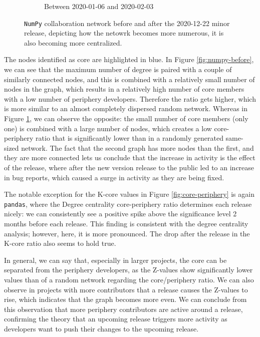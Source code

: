 \begin{figure}[!htbp]
\begin{subfigure}{0.49\textwidth}
        \caption{Between 2020-01-06 and 2020-02-03}
        \label{fig:numpy-after}
    \end{subfigure}
    \caption{\texttt{NumPy} collaboration network before and after the 2020-12-22 minor release, depicting how the netowrk becomes more numerous, it is also becoming more centralized.}
    \label{fig:core-periphery-numpy}
\end{figure}

The nodes identified as core are highlighted in blue. In Figure \ref{fig:numpy-before}, we can see that the maximum number of degree is paired with a couple of similarly connected nodes, and this is combined with a relatively small number of nodes in the graph, which results in a relatively high number of core members with a low number of periphery developers. Therefore the ratio gets higher, which is more similar to an almost completely dispersed random network. Whereas in Figure \ref{fig:numpy-after}, we can observe the opposite: the small number of core members (only one) is combined with a large number of nodes, which creates a low core-periphery ratio that is significantly lower than in a randomly generated same-sized network. The fact that the second graph has more nodes than the first, and they are more connected lets us conclude that the increase in activity is the effect of the release, where after the new version release to the public led to an increase in bug reports, which caused a surge in activity as they are being fixed.

The notable exception for the K-core values in Figure \ref{fig:core-periphery} is again \texttt{pandas}, where the Degree centrality core-periphery ratio determines each release nicely: we can consistently see a positive spike above the significance level 2 months before each release. This finding is consistent with the degree centrality analysis; however, here, it is more pronounced. The drop after the release in the K-core ratio also seems to hold true.

In general, we can say that, especially in larger projects, the core can be separated from the periphery developers, as the Z-values show significantly lower values than of a random network regarding the core/periphery ratio. We can also observe in projects with more contributors that a release causes the Z-values to rise, which indicates that the graph becomes more even. We can conclude from this observation that more periphery contributors are active around a release, confirming the theory that an upcoming release triggers more activity as developers want to push their changes to the upcoming release.

